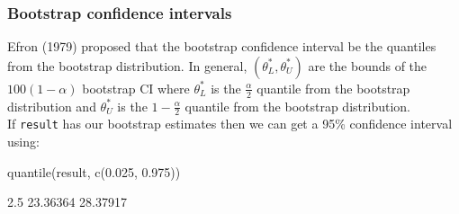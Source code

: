 \documentclass[a4paper]{article}
\begin{document}
\subsubsection{Bootstrap confidence intervals}
Efron (1979) proposed that the bootstrap confidence interval be the quantiles from the bootstrap distribution.
In general, \( (\theta_L^\ast, \theta_U^\ast) \) are the bounds of the \( 100(1-\alpha) \) bootstrap CI where \( \theta_L^\ast \) is the \( \frac{\alpha}{2} \) quantile from the bootstrap distribution and  \( \theta_U^\ast \) is the \( 1-\frac{\alpha}{2} \) quantile from the bootstrap distribution.\\
If \lstinline|result| has our bootstrap estimates then we can get a 95\% confidence interval using:
\begin{Schunk}
\begin{Sinput}
quantile(result, c(0.025, 0.975))
\end{Sinput}
\begin{Soutput}
    2.5%
23.36364 28.37917 
\end{Soutput}
\end{Schunk}
\end{document}
